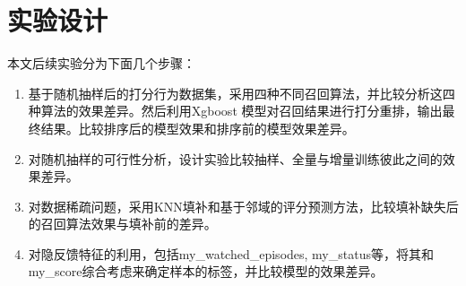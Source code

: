   \section{实验设计}
  本文后续实验分为下面几个步骤：
  \begin{enumerate}
    \item 基于随机抽样后的打分行为数据集，采用四种不同召回算法，并比较分析这四种算法的效果差异。然后利用Xgboost
    模型对召回结果进行打分重排，输出最终结果。比较排序后的模型效果和排序前的模型效果差异。
    \item 对随机抽样的可行性分析，设计实验比较抽样、全量与增量训练彼此之间的效果差异。
    \item 对数据稀疏问题，采用KNN填补和基于邻域的评分预测方法，比较填补缺失后的召回算法效果与填补前的差异。
    \item 对隐反馈特征的利用，包括my\_watched\_episodes, my\_status等，将其和my\_score综合考虑来确定样本的标签，并比较模型的效果差异。
  \end{enumerate}